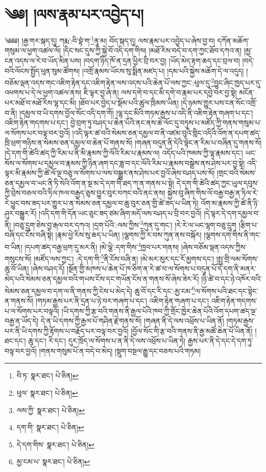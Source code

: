 \setcounter{footnote}{0} 
\chapter{༄༅། །ལས་རྣམ་པར་འབྱེད་པ།}༄༅༅། །རྒྱ་གར་སྐད་དུ། ཀརྨ་:བི་བྷཾ་ག་\footnote{བི་ཏ་  སྣར་ཐང་།  པེ་ཅིན། }ནཱ་མ། བོད་སྐད་དུ། ལས་རྣམ་པར་འབྱེད་པ་ཞེས་བྱ་བ། དཀོན་མཆོག་གསུམ་ལ་ཕྱག་འཚལ་ལོ། །དིང་སང་དུས་ཀྱི་སྐྱེ་བོ་འདི་དག་གིས། །མཐོ་རིས་བདེ་བ་དག་ཀྱང་ཐོབ་དཀའ་ན། །མྱ་ངན་འདས་ལ་རེ་བ་ཡོད་མིན་པས། །བདག་ཉིད་ཁོ་ན་དྲན་ཕྱིར་བྲི་བར་བྱ། །ཡོད་མེད་རྟག་ཆད་དང་བྲལ་བ། །བདེ་བའི་ལོངས་སྤྱོད་ཕུན་སུམ་ཚོགས། །འགྲོ་རྣམས་ཡོངས་སུ་སྨིན་མཛད་པ། །དམ་པའི་སྐྱེས་མཆོག་དེ་ལ་འདུད། །བཅོམ་ལྡན་འདས་གང་འཇིག་རྟེན་དང་འཇིག་རྟེན་ལས་འདས་པའི་ཆེན་པོ་ལས་ཀྱང་:ཕུལ་དུ་\footnote{ཕུལ་  སྣར་ཐང་།  པེ་ཅིན། }བྱུང་ཞིང་ཁྱད་པར་དུ་འཕགས་པ་དེ་ལ་ཕྱག་འཚལ་ནས། ཇི་ལྟར་བྱ་ཞེ་ན། ལས་དགེ་བ་དང་མི་དགེ་བ་རྣམ་པར་དབྱེ་བར་བྱ་སྟེ། མངོན་པར་མཐོ་བ་མཐོ་རིས་ལྷ་དང་མི། །ཐོབ་པར་བྱེད་པ་སྡོམ་པའི་ཚུལ་ཁྲིམས་ཡིན། །དེ་ཉམས་གྱུར་པས་ངན་སོང་འགྲོ་བ་ནི། །དམྱལ་བ་ཡི་དགས་བྱོལ་སོང་འདི་དག་གོ། །ལྷ་དང་མིའི་གཏམ་རྒྱས་པ་འདི་ནི་འཇིག་རྟེན་གཞག་པ་དང་། འཇིག་རྟེན་གདགས་པ་དང་། བྱེ་བྲག་ཏུ་བཤད་པ་ཆེན་པོའི་ནང་ནས་ཆེ་ལོང་དུ་བཏུས་པ་མཛོད་ཀྱི་གནས་གསུམ་པ་ལ་སོགས་པར་བལྟ་བར་བྱའོ། །འདི་ལྟར་ཚ་བའི་སེམས་ཅན་དམྱལ་བ་ནི་འཛམ་བུའི་གླིང་འདིའི་འོག་ན་དཔག་ཚད་ཁྲི་ཕྲག་གཉིས་ན་སེམས་ཅན་དམྱལ་བ་ཆེན་པོ་གནས་སོ། །གཞན་བདུན་ནི་དེའི་སྟེང་ན་རིམ་པ་བཞིན་དུ་གནས་སོ། །དེ་དག་གི་ཚེའི་ཚད་ཀྱི་རིམ་པ་ནི་མི་རྣམས་ཀྱི་ལོའི་རིམ་པ་རྣམས་ལ། འདོད་པའི་ཁམས་ཀྱི་ལྷ་རྣམས་དང་། ཡང་སོས་ལ་སོགས་པ་དམྱལ་བ་རྣམས་ཀྱི་ཉིན་ཞག་དང་ཟླ་བ་དང་ལོའི་རིམ་པ་རྣམས་བསྒྲེས་ནས་ཤེས་པར་བྱ་སྟེ། འདི་ལྟར་མི་རྣམས་ཀྱི་ཚེ་ལོ་ལྔ་བཅུ་ལ་སོགས་པ་ལས་བསྒྱུར་ནས་ཤེས་པར་བྱའོ་ཞེས་བཤད་པས་སོ། །གྲང་བའི་སེམས་ཅན་དམྱལ་བ་ཡང་ནི་ཏི་སེའི་འོག་ན་སྔ་མ་དེ་དག་གི་ཐད་ཀ་ན་གནས་པ་སྟེ། དེ་དག་གི་ཚེའི་ཚད་ཀྱང་ཡུལ་དབུས་ཀྱི་བྲེས་བཅལ་བའི་ཏིལ་ཁལ་བརྒྱད་ཅུས་བྱུར་བུར་བཀང་བའི་ནང་ནས། སྐྱེས་བུ་ཞིག་གིས་ལོ་བརྒྱ་བརྒྱ་ན་ཏིལ་རེ་རེ་ཕྱུང་བས་ཟད་པར་གྱུར་པ་ན་སེམས་ཅན་དམྱལ་བ་ཆུ་བུར་ཅན་གྱི་ཚེ་ཟད་པ་ཡིན་ཏེ། འོག་མ་རྣམས་ཀྱི་ཚེ་ནི་ཉི་ཤུར་བསྒྱུར་རོ། །འདི་དག་གི་དོན་ཡང་ཅུང་ཟད་ཙམ་ཞིག་མདོ་ལས་བཤད་པ་བྲི་བར་བྱའོ། །དེ་ལྟར་དེ་དག་དམྱལ་བ་ནི། །བཅུ་དྲུག་ཅེས་བྱ་རྒལ་བར་དཀའ། །དྲག་པོའི་:ལས་ཀྱིས་\footnote{ལས་ཀྱི་  སྣར་ཐང་།  པེ་ཅིན། }ཀུན་དུ་གང་། །རེ་རེ་ལ་ཡང་ལྷག་བཅུ་དྲུག །རྩིག་པ་བཞི་དང་ངོས་བཞི་སྟེ། །རྣམ་ཕྱེ་རིས་སུ་ཆད་པ་ཡིན། །ལྕགས་ཀྱི་ར་བས་ཀུན་ནས་བསྐོར། །ལྕགས་དག་གིས་ནི་གང་བ་ཡིན། །དཔག་ཚད་བརྒྱ་ཕྲག་དུ་མར་ནི། །མེ་ལྕེ་:དག་གིས་\footnote{དག་གི་  སྣར་ཐང་།  པེ་ཅིན། }ཁྱབ་པར་གནས། །ཞེས་བཅོམ་ལྡན་འདས་ཀྱིས་གསུངས་སོ། །མཛོད་ལས་ཀྱང་། :དེ་དག་གི་\footnote{དེ་དག་གིས་  སྣར་ཐང་།  པེ་ཅིན། }ནི་ངོས་བཞི་ན། །མེ་མར་མུར་དང་རོ་མྱགས་དང་། །སྤུ་གྲི་ལམ་སོགས་ཆུ་བོ་ཡིན། །ཞེས་བཤད་དོ། །སྔོན་གྱི་མཁས་པ་ཆེན་པོ་ཁ་ཅིག་ན་རེ་ཚ་བ་ལ་སོགས་པ་བདུན་པོ་དེ་དག་ནི་མནར་མེད་པའི་སེམས་ཅན་དམྱལ་བའི་གཡས་ངོས་དང་གཡོན་ངོས་ན་གནས་སོ་ཞེས་ཟེར་རོ། །ཉི་ཚེ་བ་དང་ཉེ་འཁོར་བའི་སེམས་ཅན་དམྱལ་བ་དག་ལ་ནི་གནས་ཀྱི་ངེས་པ་མེད་དེ། ཆུ་བོ་དང་རི་དང་:མྱ་ངམ་\footnote{མྱ་ངམ་པ་  སྣར་ཐང་།  པེ་ཅིན། }ལ་སོགས་པའི་ཐང་དང་སྟེང་ན་གནས་སོ། །གཏམ་རྒྱས་པར་ནི་དྲན་པ་ཉེ་བར་གཞག་པ་དང་། འཇིག་རྟེན་གཞག་པ་དང་། འཇིག་རྟེན་གདགས་པ་ལ་སོགས་པར་བལྟའོ། །ཡི་དགས་ཀྱི་རྩ་བའི་གནས་ནི་རྒྱལ་པོའི་ཁབ་ཀྱི་གྲོང་ཁྱེར་ཆེན་པོའི་འོག་དཔག་ཚད་ལྔ་བརྒྱ་ན་ཡོད་དེ། དེ་ན་ཡི་དགས་ཀྱི་རྒྱལ་པོ་གཤིན་རྗེ་གནས་སོ། །གཞན་ནི་དེ་ལས་འཕྲོས་པ་ཡིན་ནོ། །གཏམ་རྒྱས་པར་ནི་ཡི་དགས་ཀྱི་རྟོགས་པ་བརྗོད་པར་བལྟ་བར་བྱའོ། །བྱོལ་སོང་གི་རྩ་བའི་གནས་ནི་རྒྱ་མཚོ་ཆེན་པོ་ཡིན་ནོ། །ཐང་དང་། ཆུ་དང་། རི་དང་། དུར་ཁྲོད་ལ་སོགས་པ་ན་ནི་དེ་ལས་འཕྲོས་པ་ཡིན་ཏེ། རྒྱས་པར་ནི་དེ་དང་དེ་དག་ཏུ་བལྟ་བར་བྱའོ། །གནས་གསུམ་པོ་ན་བདེ་བ་མེད། །སྡུག་བསྔལ་རྒྱུ་དང་བཅས་པའི་གཏམ། 